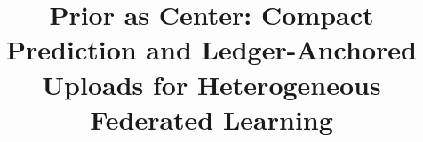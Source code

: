 \documentclass{svproc}
\begin{document}
\mainmatter
\title{Prior as Center: Compact Prediction and Ledger-Anchored Uploads for Heterogeneous Federated Learning}
\author{}
\authorrunning{}
\tocauthor{}
\institute{}
\maketitle













\end{document}

